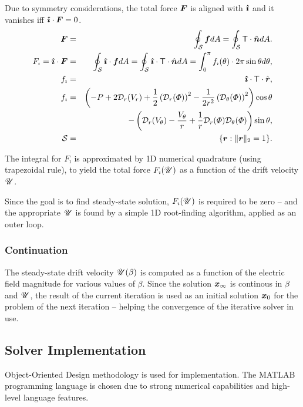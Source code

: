 Due to symmetry considerations, the total force $\boldsymbol{F}$ is 
aligned with $\boldsymbol{\hat{\imath}}$ and it vanishes iff $\boldsymbol{\hat{\imath}} \cdot \boldsymbol{F} = 0$.
\begin{eqnarray}
\boldsymbol{F} &=& \oint_\mathcal{S} \boldsymbol{f}  dA = 
\oint_\mathcal{S} \mathsf{T} \cdot \hat{\boldsymbol{n}}  dA. \\
F_\imath = \boldsymbol{\hat{\imath}} \cdot \boldsymbol{F} &=& \oint_\mathcal{S} \boldsymbol{\hat{\imath}} \cdot \boldsymbol{f}  dA = 
\oint_\mathcal{S} \boldsymbol{\hat{\imath}} \cdot \mathsf{T} \cdot \hat{\boldsymbol{n}}  dA = 
\int_0^\pi f_\imath(\theta) \cdot 2\pi \sin\theta d\theta ,
\\  
f_\imath &=& \boldsymbol{\hat{\imath}} \cdot \mathsf{T} \cdot \hat{\boldsymbol{r}},
\\  
f_\imath &=& \left(-P + 2\mathcal{D}_r(V_r) + 
\frac{1}{2}\left(\mathcal{D}_r(\varPhi)\right)^2 - \frac{1}{2r^2}\left(\mathcal{D}_\theta(\varPhi)\right)^2\right)\cos\theta 
\\  
&& -\left(\mathcal{D}_r(V_\theta) - \frac{V_\theta}{r}
+ \frac{1}{r}\mathcal{D}_r(\varPhi) \mathcal{D}_{\theta}(\varPhi)\right)\sin\theta, \\
 \mathcal{S} &=& \{\boldsymbol{r} : \|\boldsymbol{r}\|_2 = 1\}.
\end{eqnarray}

The integral for $F_\imath$ is approximated by 1D numerical quadrature
(using trapezoidal rule), to yield 
the total force $F_\imath(\mathscr{U})$ as a function of the drift velocity $\mathscr{U}$.

Since the goal is to find steady-state solution, $F_\imath(\mathscr{U})$ 
is required to be zero --
and the appropriate $\mathscr{U}$ is found by a simple 1D root-finding algorithm,
applied as an outer loop.

\subsubsection{Continuation}

The steady-state drift velocity $\mathscr{U}(\beta)$ is computed as a function 
of the electric field magnitude for various values of $\beta$.
Since the solution $\boldsymbol{x}_\infty$ is continous in $\beta$ and $\mathscr{U}$, 
the result of the current iteration is used as an initial solution $\boldsymbol{x}_0$ for the problem 
of the next iteration -- helping the convergence of the iterative solver in use.

\subsection{Solver Implementation}

Object-Oriented Design methodology is used for implementation.
The MATLAB programming language is chosen due to strong numerical capabilities
and high-level language features.

